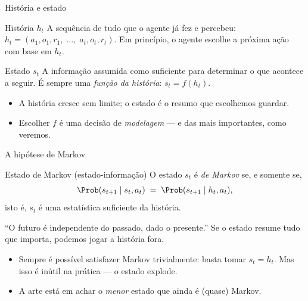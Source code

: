 \documentclass[aspectratio=169, 11pt]{beamer}
\begin{document}
\begin{frame}{História e estado}
  \begin{defbox}{História $h_t$}
    A sequência de tudo que o agente já fez e percebeu:
    $h_t = (a_1, o_1, r_1,\; \ldots,\; a_t, o_t, r_t)$.
    Em princípio, o agente escolhe a próxima ação com base em $h_t$.
  \end{defbox}

  \begin{defbox}{Estado $s_t$}
    A informação assumida como suficiente para determinar o que acontece a
    seguir. É sempre uma \emph{função da história}: $s_t = f(h_t)$.
  \end{defbox}

  \begin{itemize}
    \item A história cresce sem limite; o estado é o \alert{resumo} que
          escolhemos guardar.
    \item Escolher $f$ é uma decisão de \emph{modelagem} — e das mais
          importantes, como veremos.
  \end{itemize}
\end{frame}

\begin{frame}{A hipótese de Markov}
  \begin{defbox}{Estado de Markov (estado-informação)}
    O estado $s_t$ é \emph{de Markov} se, e somente se,
    \[
      \Prob(s_{t+1} \mid s_t, a_t) \;=\; \Prob(s_{t+1} \mid h_t, a_t),
    \]
    isto é, $s_t$ é uma \alert{estatística suficiente} da história.
  \end{defbox}

  \begin{ideiabox}
    ``O futuro é independente do passado, dado o presente.'' Se o estado
    resume tudo que importa, podemos jogar a história fora.
  \end{ideiabox}

  \begin{itemize}
    \item Sempre é possível satisfazer Markov trivialmente: basta tomar
          $s_t = h_t$. Mas isso é inútil na prática — o estado explode.
    \item A arte está em achar o \emph{menor} estado que ainda é (quase)
          Markov.
  \end{itemize}
\end{frame}
\end{document}
